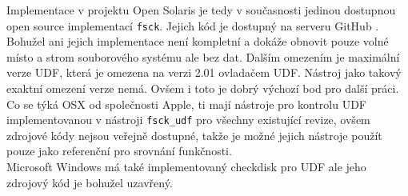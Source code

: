 Implementace v projektu Open Solaris je tedy v současnosti jedinou dostupnou open source implementací \texttt{fsck}. Jejich kód je dostupný na serveru GitHub \cite{solaris-github}. Bohužel ani jejich implementace není kompletní a dokáže obnovit pouze volné místo a strom souborového systému ale bez dat. Dalším omezením je maximální verze UDF, která je omezena na verzi 2.01 ovladačem UDF. Nástroj jako takový exaktní omezení verze nemá. Ovšem i toto je dobrý výchozí bod pro další práci.\\
Co se týká OSX od společnosti Apple, ti mají nástroje pro kontrolu UDF implementovanou v nástroji \texttt{fsck\_udf} pro všechny existující revize, ovšem zdrojové kódy nejsou veřejně dostupné, takže je možné jejich nástroje použít pouze jako referenční pro srovnání funkčnosti.\\
Microsoft Windows má také implementovaný checkdisk pro UDF ale jeho zdrojový kód je bohužel uzavřený.\\

